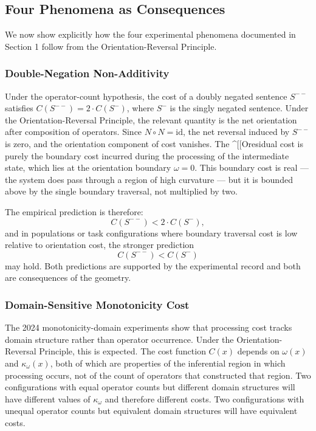 \documentclass[12pt]{article}
\theoremstyle{remark}
\begin{document}
\subsection{Four Phenomena as Consequences}

We now show explicitly how the four experimental phenomena documented in
Section 1 follow from the Orientation-Reversal Principle.

\subsubsection{Double-Negation Non-Additivity}

Under the operator-count hypothesis, the cost of a doubly negated
sentence $S^{--}$ satisfies $C(S^{--}) = 2 \cdot C(S^-)$, where $S^-$
is the singly negated sentence. Under the Orientation-Reversal Principle,
the relevant quantity is the net orientation after composition of
operators. Since $N \circ N = \mathrm{id}$, the net reversal induced by
$S^{--}$ is zero, and the orientation component of cost vanishes. The
^[[Oresidual cost is purely the boundary cost incurred during the processing
of the intermediate state, which lies at the orientation boundary
$\omega = 0$. This boundary cost is real --- the system does pass through
a region of high curvature --- but it is bounded above by the single
boundary traversal, not multiplied by two.

The empirical prediction is therefore:
\[
C(S^{--}) < 2 \cdot C(S^-),
\]
and in populations or task configurations where boundary traversal cost
is low relative to orientation cost, the stronger prediction
\[
C(S^{--}) < C(S^-)
\]
may hold. Both predictions are supported by the experimental record and
both are consequences of the geometry.
\subsubsection{Domain-Sensitive Monotonicity Cost}

The 2024 monotonicity-domain experiments show that processing cost tracks
domain structure rather than operator occurrence. Under the
Orientation-Reversal Principle, this is expected. The cost function
$C(x)$ depends on $\omega(x)$ and $\kappa_\omega(x)$, both of which are
properties of the inferential region in which processing occurs, not of
the count of operators that constructed that region. Two configurations
with equal operator counts but different domain structures will have
different values of $\kappa_\omega$ and therefore different costs. Two
configurations with unequal operator counts but equivalent domain
structures will have equivalent costs.
\end{document}
